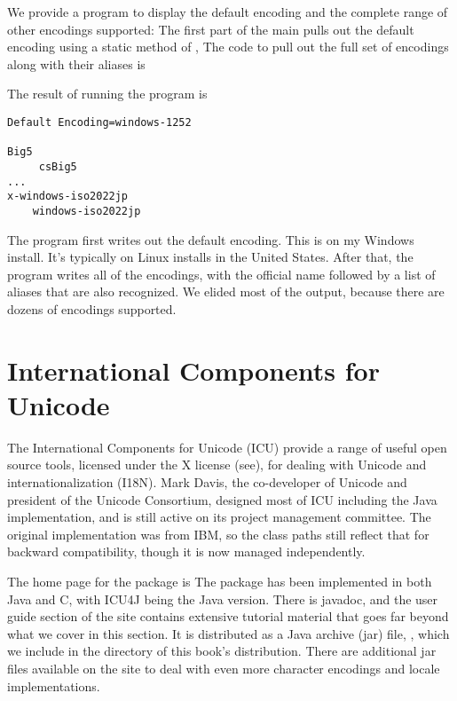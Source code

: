 We provide a program to
display the default encoding and the complete range of other encodings
supported:
%
%
The first part of the main pulls out the default encoding
using a static method of ,
%
%
The code to pull out the full set of encodings along with their
aliases is
%

The result of running the program is
%
\begin{verbatim}
Default Encoding=windows-1252

Big5
     csBig5
...
x-windows-iso2022jp
    windows-iso2022jp
\end{verbatim}
%
The program first writes out the default encoding.  This is
 on my Windows install.  It's typically
 on Linux installs in the United States.
After that, the program writes all of the encodings, with the official
name followed by a list of aliases that are also recognized.  We
elided most of the output, because there are dozens of encodings
supported.


\section{International Components for Unicode}

The International Components for Unicode (ICU) provide a range of
useful open source tools, licensed under the X license
(see), for dealing with Unicode and
internationalization (I18N).  Mark Davis, the co-developer of Unicode
and president of the Unicode Consortium, designed most of ICU
including the Java implementation, and is still active on its project
management committee.  The original implementation was from IBM, so
the class paths still reflect that for backward compatibility, though
it is now managed independently.

The home page for the package is
%
%
The package has been implemented in both Java and C, with ICU4J
being the Java version.  There is javadoc, and the user guide
section of the site contains extensive tutorial material that goes
far beyond what we cover in this section.  It is distributed
as a Java archive (jar) file, ,
which we include in the 
directory of this book's distribution.  There are additional jar
files available on the site to deal with even more character
encodings and locale implementations.

